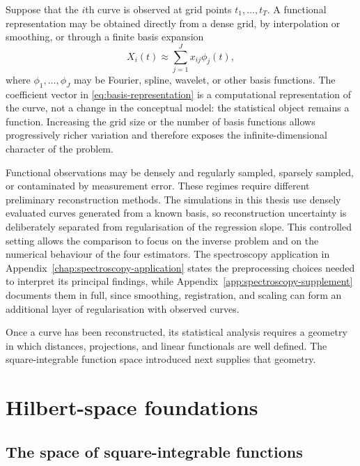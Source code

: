 Suppose that the $i$th curve is observed at grid points $t_1,\ldots,t_T$. A functional representation may be obtained directly from a dense grid, by interpolation or smoothing, or through a finite basis expansion
\begin{equation}
    X_i(t)\approx \sum_{j=1}^{J} x_{ij}\phi_j(t),
    \label{eq:basis-representation}
\end{equation}
where $\phi_1,\ldots,\phi_J$ may be Fourier, spline, wavelet, or other basis functions. The coefficient vector in \eqref{eq:basis-representation} is a computational representation of the curve, not a change in the conceptual model: the statistical object remains a function. Increasing the grid size or the number of basis functions allows progressively richer variation and therefore exposes the infinite-dimensional character of the problem.

Functional observations may be densely and regularly sampled, sparsely sampled, or contaminated by measurement error. These regimes require different preliminary reconstruction methods. The simulations in this thesis use densely evaluated curves generated from a known basis, so reconstruction uncertainty is deliberately separated from regularisation of the regression slope. This controlled setting allows the comparison to focus on the inverse problem and on the numerical behaviour of the four estimators. The spectroscopy application in Appendix~\ref{chap:spectroscopy-application} states the preprocessing choices needed to interpret its principal findings, while Appendix~\ref{app:spectroscopy-supplement} documents them in full, since smoothing, registration, and scaling can form an additional layer of regularisation with observed curves.

Once a curve has been reconstructed, its statistical analysis requires a geometry in which distances, projections, and linear functionals are well defined. The square-integrable function space introduced next supplies that geometry.

\section{Hilbert-space foundations}
\label{sec:hilbert-foundations}

\subsection{The space of square-integrable functions}

